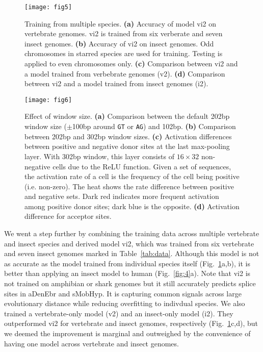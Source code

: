 \documentclass[webpdf,contemporary,large,namedate]{oup-authoring-template}%
\begin{document}
\begin{figure}[tb]
\texttt{[image: fig5]}
\caption{Training from multiple species.
{\bf (a)} Accuracy of model vi2 on vertebrate genomes. vi2 is trained from six verberate and seven insect genomes.
{\bf (b)} Accuracy of vi2 on insect genomes. Odd chromosomes in starred species are used for training.
Testing is applied to even chromosomes only.
{\bf (c)} Comparison between vi2 and a model trained from verbebrate genomes (v2).
{\bf (d)} Comparison between vi2 and a model trained from insect genomes (i2).}\label{fig:5}
\end{figure}

\begin{figure}[bt]
\texttt{[image: fig6]}
\caption{Effect of window size.
{\bf (a)} Comparison between the default 202bp window size ($\pm$100bp around {\tt GT} or {\tt AG}) and 102bp.
{\bf (b)} Comparison between 202bp and 302bp window sizes.
{\bf (c)} Activation differences between positive and negative donor sites at the last max-pooling layer.
With 302bp window, this layer consists of $16\times32$ non-negative cells due to the ReLU function.
Given a set of sequences, the activation rate of a cell is the frequency of the cell being positive (i.e. non-zero).
The heat shows the rate difference between positive and negative sets.
Dark red indicates more frequent activation among positive donor sites; dark blue is the opposite.
{\bf (d)} Activation difference for acceptor sites.}\label{fig:6}
\end{figure}

We went a step further by combining the training data across multiple vertebrate and insect species
and derived model vi2, which was trained from six vertebrate and seven insect genomes marked in Table~\ref{tab:data}.
Although this model is not as accurate as the model trained from individual species itself (Fig.~\ref{fig:5}a,b),
it is better than applying an insect model to human (Fig.~\ref{fig:4}a).
Note that vi2 is not trained on amphibian or shark genomes but it still accurately predicts splice sites in aDenEbr and sMobHyp.
It is capturing common signals across large evolutionary distance while reducing overfitting to indivdual species.
We also trained a vertebrate-only model (v2) and an insect-only model (i2).
They outperformed vi2 for vertebrate and insect genomes, respectively (Fig.~\ref{fig:5}c,d),
but we deemed the improvement is marginal and outweighed by the convenience
of having one model across vertebrate and insect genomes.
\end{document}
